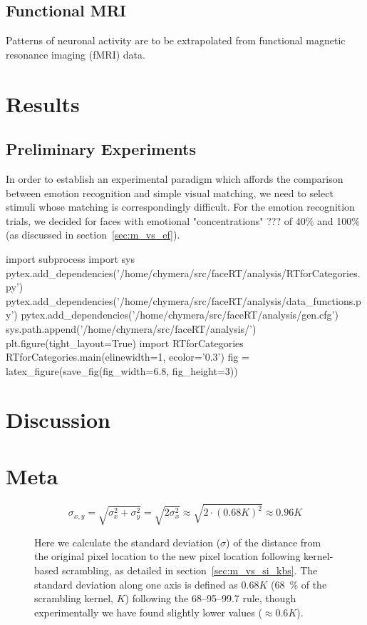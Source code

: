     \section{Functional MRI}
    Patterns of neuronal activity are to be extrapolated from functional magnetic resonance imaging (fMRI) data.
	 
\chapter{Results}
    \section{Preliminary Experiments}\label{sec:r_pe}
    In order to establish an experimental paradigm which affords the comparison between emotion recognition and simple visual matching, we need to select stimuli whose matching is correspondingly difficult.
    For the emotion recognition trials, we decided for faces with emotional "concentrations" ??? of 40\% and 100\% (as discussed in section~\ref{sec:m_vs_ef}).
    \begin{pycode}
import subprocess
import sys
pytex.add_dependencies('/home/chymera/src/faceRT/analysis/RTforCategories.py')
pytex.add_dependencies('/home/chymera/src/faceRT/analysis/data_functions.py')
pytex.add_dependencies('/home/chymera/src/faceRT/analysis/gen.cfg')
sys.path.append('/home/chymera/src/faceRT/analysis/')
plt.figure(tight_layout=True)
import RTforCategories
RTforCategories.main(elinewidth=1, ecolor='0.3')
fig = latex_figure(save_fig(fig_width=6.8, fig_height=3))
    \end{pycode}
\chapter{Discussion}
\chapter{Meta}
\begin{figure}
\[ \sigma_{x,y} = \sqrt{\sigma_{x}^{2}+\sigma_{y}^{2}} = \sqrt{2\sigma_{x}^{2}} \approx \sqrt{2 \cdot (0.68 K)^{2}} \approx 0.96K\]
\caption{Here we calculate the standard deviation ($\sigma$) of the distance from the original pixel location to the new pixel location following kernel-based scrambling, as detailed in section~\ref{sec:m_vs_si_kbs}. The standard deviation along one axis is defined as $0.68K$ (\SI{68}{\percent} of the scrambling kernel, $K$) following the 68–95–99.7 rule, though experimentally we have found slightly lower values ($\approx 0.6K$).}\label{eq:lrgn}
\end{figure}

